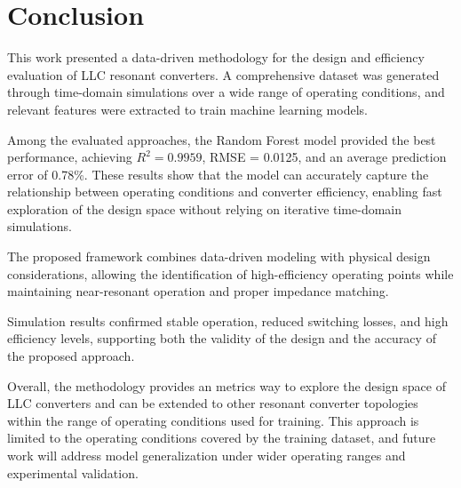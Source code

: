 \section{Conclusion}\label{sec:Conclusion}

This work presented a data-driven methodology for the design and efficiency evaluation of LLC resonant converters. A comprehensive dataset was generated through time-domain simulations over a wide range of operating conditions, and relevant features were extracted to train machine learning models.

Among the evaluated approaches, the Random Forest model provided the best performance, achieving $R^2 = 0.9959$, RMSE = 0.0125, and an average prediction error of 0.78\%. These results show that the model can accurately capture the relationship between operating conditions and converter efficiency, enabling fast exploration of the design space without relying on iterative time-domain simulations.

The proposed framework combines data-driven modeling with physical design considerations, allowing the identification of high-efficiency operating points while maintaining near-resonant operation and proper impedance matching.

Simulation results confirmed stable operation, reduced switching losses, and high efficiency levels, supporting both the validity of the design and the accuracy of the proposed approach.

Overall, the methodology provides an metrics way to explore the design space of LLC converters and can be extended to other resonant converter topologies within the range of operating conditions used for training. This approach is limited to the operating conditions covered by the training dataset, and future work will address model generalization under wider operating ranges and experimental validation.